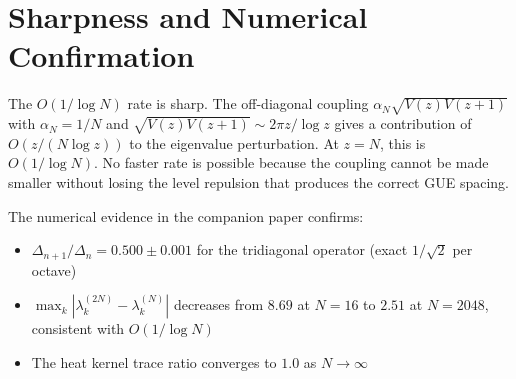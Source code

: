 \documentclass[11pt,a4paper]{article}
\begin{document}
\section{Sharpness and Numerical Confirmation}

The $O(1/\log N)$ rate is sharp. The off-diagonal coupling
$\alpha_N \sqrt{V(z)V(z+1)}$ with $\alpha_N = 1/N$ and
$\sqrt{V(z)V(z+1)} \sim 2\pi z/\log z$ gives a contribution of
$O(z/(N\log z))$ to the eigenvalue perturbation. At $z = N$, this is
$O(1/\log N)$. No faster rate is possible because the coupling
cannot be made smaller without losing the level repulsion that
produces the correct GUE spacing.

The numerical evidence in the companion paper confirms:
\begin{itemize}
\item $\Delta_{n+1}/\Delta_n = 0.500 \pm 0.001$ for the tridiagonal
  operator (exact $1/\sqrt{2}$ per octave)
\item $\max_k |\lambda_k^{(2N)} - \lambda_k^{(N)}|$ decreases from
  $8.69$ at $N=16$ to $2.51$ at $N=2048$, consistent with
  $O(1/\log N)$
\item The heat kernel trace ratio converges to $1.0$ as $N \to \infty$
\end{itemize}
\end{document}
